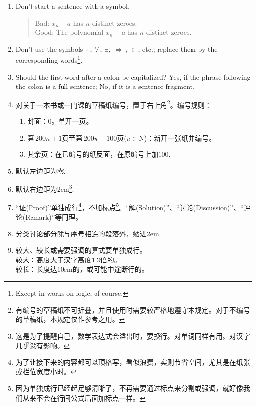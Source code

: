 \documentclass[11pt, a4paper, titlepage]{article}
\begin{document}
\begin{enumerate}
\item Don't start a sentence with a symbol.
    \begin{quote}
    Bad: $x_{n} - a$ has $n$ distinct zeroes.\\
    Good: The polynomial $x_{n} - a$ has $n$ distinct zeroes.
    \end{quote}

\item Don't use the symbols $\therefore\, , \ \forall\, , \ \exists, \ \Rightarrow\, , \ \in$, etc.; replace them by the corresponding words\footnote{Except in works on logic, of course.}.

\item Should the first word after a colon be capitalized? Yes, if the phrase following the colon is a full sentence; No, if it is a sentence fragment.

\item 对关于一本书或一门课的草稿纸编号，置于右上角\footnote{有编号的草稿纸不可折叠，并且使用时需要较严格地遵守本规定。对于不编号的草稿纸，本规定仅作参考之用。}。编号规则：
    \begin{enumerate}[label=(\Roman*)]
        \item 封面：0。单开一页。
        \item 第$\, 200n+1$页至第$\, 200n+100$页($n\in \mathrm{N}$)：新开一张纸并编号。
        \item 其余页：在已编号的纸反面，在原编号上加$100$.
    \end{enumerate}

\item 默认左边距为零.

\item 默认右边距为2em\footnote{这是为了提醒自己，数学表达式会溢出时，要换行。对单词同样有用。对汉字几乎没有影响。}.

\item “证(Proof)”单独成行\footnote{为了让接下来的内容都可以顶格写，看似浪费，实则节省空间，尤其是在纸张或栏位宽度小时。}，不加标点\footnote{因为单独成行已经起足够清晰了，不再需要通过标点来分割或强调，就好像我们从来不会在行间公式后面加标点一样。}。“解(Solution)”、“讨论(Discussion)”、“评论(Remark)”等同理。

\item 分类讨论部分除与序号相连的段落外，缩进2em.

\item 较大、较长或需要强调的算式要单独成行。\\
    较大：高度大于汉字高度1.3倍的。\\
    较长：长度达10em的，或可能中途断行的。\\


\end{enumerate}
\end{document}
